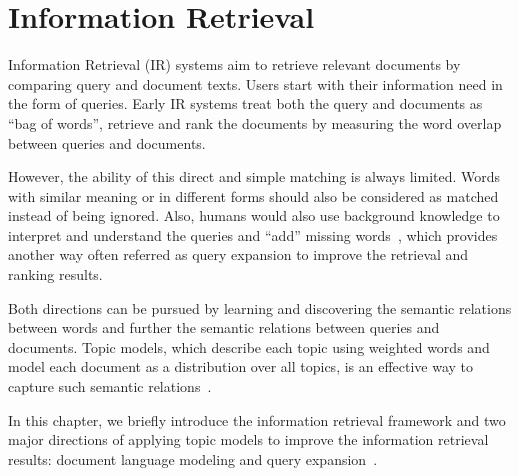\chapter{Information Retrieval}
\label{ch:ir}

Information Retrieval (IR) systems aim to retrieve relevant documents by comparing query and document texts. Users start with their information need in the form of queries. Early IR systems treat both the query and documents as ``bag of words'', retrieve and rank the documents by measuring the word overlap between queries and documents. 

However, the ability of this direct and simple matching is always limited. Words with similar meaning or in different forms should also be considered as matched instead of being ignored. Also, humans would also use background knowledge to interpret and understand the queries and ``add'' missing words~\citep{wei-07}, which provides another way often referred as query expansion to improve the retrieval and ranking results.

Both directions can be pursued by learning and discovering the semantic relations between words and further the semantic relations between queries and documents. Topic models, which describe each topic using weighted words and model each document as a distribution over all topics, is an effective way to capture such semantic relations~\citep{deerwester-90,hofmann-99a}.

In this chapter, we briefly introduce the information retrieval framework and two major directions of applying topic models to improve the information retrieval results: document language modeling \citep{Lu-2011,wei-06} and query expansion~\citep{Park-2009,Andrzejewski-2011}.





